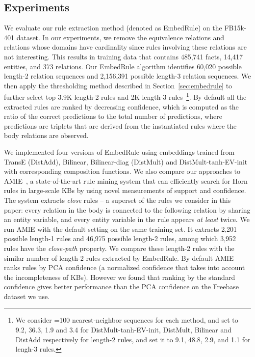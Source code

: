 \documentclass{article} \usepackage{iclr2015,times}
\begin{document}
\subsection{Experiments} 
We evaluate our rule extraction method (denoted as {\sc EmbedRule}) on the FB15k-401 dataset. In our experiments, we remove the equivalence relations and relations whose domains have cardinality  since rules involving these relations are not interesting. This results in training data that contains 485,741 facts, 14,417 entities, and 373 relations. Our {\sc EmbedRule} algorithm identifies 60,020 possible length-2 relation sequences and 2,156,391 possible length-3 relation sequences. We then apply the thresholding method described in Section~\ref{sec:embedrule} to further select top 3.9K length-2 rules and 2K length-3 rules~\footnote{We consider =100 nearest-neighbor sequences for each method, and set  to 9.2, 36.3, 1.9 and 3.4 for {\sc DistMult-tanh-EV-init}, {\sc DistMult}, {\sc Bilinear} and {\sc DistAdd} respectively for length-2 rules, and set it to 9.1, 48.8, 2.9, and 1.1 for lengh-3 rules.}. By default all the extracted rules are ranked by decreasing confidence, which is computed as the ratio of the correct predictions to the total number of predictions, where predictions are triplets that are derived from the instantiated rules where the body relations are observed. 

We implemented four versions of {\sc EmbedRule} using embeddings trained from {\sc TransE (DistAdd)}, {\sc Bilinear}, {\sc Bilinear-diag (DistMult)} and {\sc DistMult}-tanh-EV-init with corresponding composition functions. We also compare our approaches to {\sc AMIE}~\citep{galarraga2013amie}, a state-of-the-art rule mining system that can efficiently search for Horn rules in large-scale KBs by using novel measurements of support and confidence. The system extracts \textit{close} rules -- a superset of the rules we consider in this paper: every relation in the body is connected to the following relation by sharing an entity variable, and every entity variable in the rule appears \textit{at least} twice. We run AMIE with the default setting on the same training set. It extracts 2,201 possible length-1 rules and 46,975 possible length-2 rules, among which 3,952 rules have the \textit{close-path} property. We compare these length-2 rules with the similar number of length-2 rules extracted by {\sc EmbedRule}. By default AMIE ranks rules by PCA confidence (a normalized confidence that takes into account the incompleteness of KBs). However we found that ranking by the standard confidence gives better performance than the PCA confidence on the Freebase dataset we use. 
\end{document}
